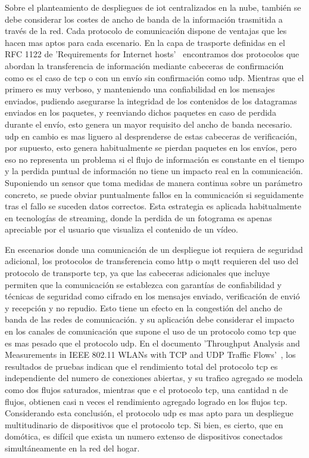 Sobre el planteamiento de despliegues de \gls{iot} centralizados en la nube, también se debe considerar los costes de ancho de banda de la información trasmitida a través de la red. Cada protocolo de comunicación dispone de ventajas que les hacen mas aptos para cada escenario. En la capa de trasporte definidas en el RFC 1122 de 'Requirements for Internet hosts'~\cite{braden1989requirements} encontramos dos protocolos que abordan la transferencia de información mediante cabeceras de confirmación como es el caso de \gls{tcp} o con un envío sin confirmación como \gls{udp}. Mientras que el primero es muy verboso, y manteniendo una confiabilidad en los mensajes enviados, pudiendo asegurarse la integridad de los contenidos de los datagramas enviados en los paquetes, y reenviando dichos paquetes en caso de perdida durante el envío, esto genera un mayor requisito del ancho de banda necesario. \gls{udp} en cambio es mas liguero al desprenderse de estas cabeceras de verificación, por supuesto, esto genera habitualmente se pierdan paquetes en los envíos, pero eso no representa un problema si el flujo de información es constante en el tiempo y la perdida puntual de información no tiene un impacto real en la comunicación. Suponiendo un sensor que toma medidas de manera continua sobre un parámetro concreto, se puede obviar puntualmente fallos en la comunicación si seguidamente tras el fallo se suceden  datos correctos. Esta estrategia es aplicada habitualmente en tecnologías de streaming, donde la perdida de un fotograma es apenas apreciable por el usuario que visualiza el contenido de un vídeo. 

\vspace{1cm}

En escenarios donde una comunicación de un despliegue \gls{iot} requiera de seguridad adicional, los protocolos de transferencia como \gls{http} o \gls{mqtt} requieren del uso del protocolo de transporte \gls{tcp}, ya que las cabeceras adicionales que incluye permiten que la comunicación se establezca con garantías de confiabilidad y técnicas de seguridad como cifrado en los mensajes enviado, verificación de envió y recepción y no repudio. Esto tiene un efecto en la congestión del ancho de banda de las redes de comunicación. y su aplicación debe considerar el impacto en los canales de comunicación que supone el uso de un protocolo como \gls{tcp} que es mas pesado que el protocolo \gls{udp}. En el documento 'Throughput Analysis and Measurements in IEEE 802.11 WLANs with TCP and UDP Traffic Flows'~\cite{bruno2007throughput}, los resultados de pruebas indican que el rendimiento total del protocolo \gls{tcp} es independiente del numero de conexiones abiertas, y su trafico agregado se modela como dos flujos saturados, mientras que e el protocolo \gls{tcp}, una cantidad n de flujos, obtienen casi n veces el rendimiento agregado logrado en los flujos \gls{tcp}. Considerando esta conclusión, el protocolo \gls{udp} es mas apto para un despliegue multitudinario de dispositivos que el protocolo \gls{tcp}. Si bien, es cierto, que en domótica, es difícil que exista un numero extenso de dispositivos conectados simultáneamente en la red del hogar.

